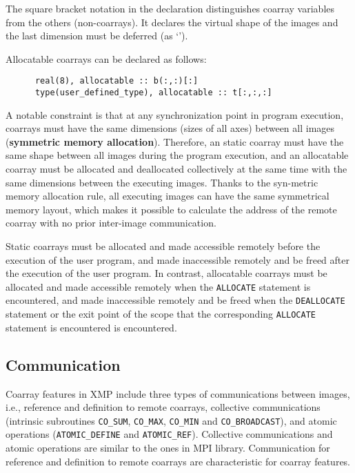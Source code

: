 The square bracket notation in the declaration distinguishes coarray variables from 
the others (non-coarrays). It declares the virtual shape of the images and the last 
dimension must be deferred (as `{\tt *}').

Allocatable coarrays can be declared as follows:
\begin{verbatim}
      real(8), allocatable :: b(:,:)[:]
      type(user_defined_type), allocatable :: t[:,:,:]
\end{verbatim}


A notable constraint is that at any synchronization point in program execution, 
coarrays must have the same dimensions (sizes of all axes) between all images
({\bf symmetric memory allocation}). 
Therefore, an static coarray must have the same shape between all images during 
the program execution, and an allocatable coarray must be allocated and deallocated 
collectively at the same time with the same dimensions between the executing images.
Thanks to the syn-metric memory allocation rule, all executing images can have
the same symmetrical memory layout, which makes it possible to calculate the address 
of the remote coarray with no prior inter-image communication.

\requirement
Static coarrays must be allocated and made accessible remotely
before the execution of the user program, and 
made inaccessible remotely and be freed after the execution of the user program.
In contrast, 
allocatable coarrays must be allocated and made accessible remotely
when the {\tt ALLOCATE} statement is encountered, and 
made inaccessible remotely and be freed when the {\tt DEALLOCATE} statement or 
the exit point of the scope that the corresponding {\tt ALLOCATE} statement is encountered 
is encountered.


\subsection{Communication}\label{sec:spec-comm}

Coarray features in XMP include three types of communications between images, i.e.,
reference and definition to remote coarrays,
collective communications (intrinsic subroutines {\tt CO\_SUM}, {\tt CO\_MAX}, 
{\tt CO\_MIN} and {\tt CO\_BROADCAST}), and
atomic operations ({\tt ATOMIC\_DEFINE} and {\tt ATOMIC\_REF}).
%
Collective communications and atomic operations are similar to the ones 
in MPI library.
Communication for reference and definition to remote coarrays are 
characteristic for coarray features.


